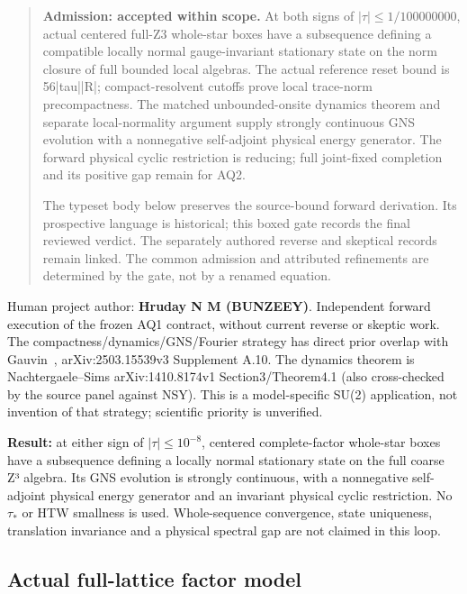 \begin{quote}\small \textbf{Admission: accepted within scope.} At both signs of \(|\tau|\le 1/100000000\), actual centered full-Z3 whole-star boxes have a subsequence defining a compatible locally normal gauge-invariant stationary state on the norm closure of full bounded local algebras. The actual reference reset bound is 56|tau||R|; compact-resolvent cutoffs prove local trace-norm precompactness. The matched unbounded-onsite dynamics theorem and separate local-normality argument supply strongly continuous GNS evolution with a nonnegative self-adjoint physical energy generator. The forward physical cyclic restriction is reducing; full joint-fixed completion and its positive gap remain for AQ2.\par The typeset body below preserves the source-bound forward derivation. Its prospective language is historical; this boxed gate records the final reviewed verdict. The separately authored reverse and skeptical records remain linked. The common admission and attributed refinements are determined by the gate, not by a renamed equation.\end{quote}
Human project author: \textbf{Hruday N M (BUNZEEY)}. Independent forward execution of the frozen AQ1 contract, without current reverse or skeptic work. The compactness/dynamics/GNS/Fourier strategy has direct prior overlap with Gauvin~\citep{gauvin2026}, arXiv:2503.15539v3 Supplement A.10. The dynamics theorem is Nachtergaele--Sims arXiv:1410.8174v1 Section3/Theorem4.1 (also cross-checked by the source panel against NSY). This is a model-specific SU(2) application, not invention of that strategy; scientific priority is unverified.

\textbf{Result:} at either sign of \(|\tau|\le 10^{-8}\), centered complete-factor whole-star boxes have a subsequence defining a locally normal stationary state on the full coarse Z³ algebra. Its GNS evolution is strongly continuous, with a nonnegative self-adjoint physical energy generator and an invariant physical cyclic restriction. No \(\tau_*\) or HTW smallness is used. Whole-sequence convergence, state uniqueness, translation invariance and a physical spectral gap are not claimed in this loop.

\hypertarget{r29-aq1-actual-full-lattice-factor-model}{%
\subsection{Actual full-lattice factor model}\label{r29:aq1:r29-aq1-actual-full-lattice-factor-model}}

